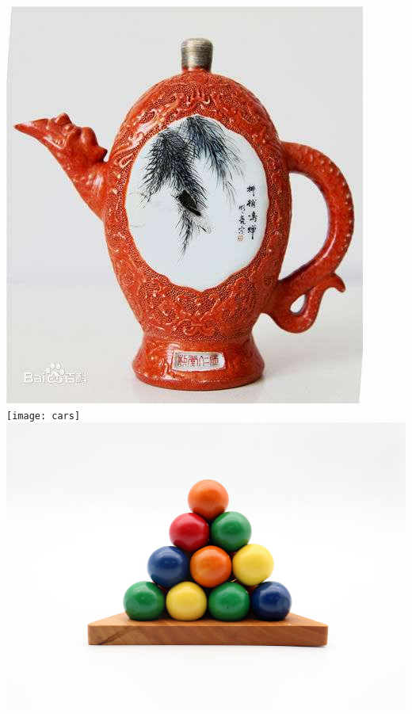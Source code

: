 \documentclass{ctexart}
\begin{document}
\includegraphics{bottle}
\texttt{[image: cars]}
\includegraphics{balls}
\end{document}
